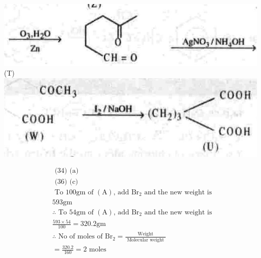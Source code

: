\documentclass[10pt]{article}
\begin{document}
\includegraphics[max width=\textwidth, center]{2025_01_28_8470952b98110cec3aabg-246(5)}\\
(T)\\
\includegraphics[max width=\textwidth, center]{2025_01_28_8470952b98110cec3aabg-246(6)}

$$
\begin{aligned}
& \text { (34) (a) } \\
& \text { (36) (c) } \\
& \text { To } 100 \mathrm{gm} \text { of }(\mathrm{A}) \text {, add } \mathrm{Br}_{2} \text { and the new weight is } \\
& 593 \mathrm{gm} \\
& \therefore \text { To } 54 \mathrm{gm} \text { of }(\mathrm{A}) \text {, add } \mathrm{Br}_{2} \text { and the new weight is } \\
& \frac{593 \times 54}{100}=320.2 \mathrm{gm} \\
& \therefore \text { No of moles of } \mathrm{Br}_{2}=\frac{\text { Weight }}{\text { Molecular weight }} \\
& =\frac{320.2}{160}=2 \text { moles }
\end{aligned}
$$
\end{document}
